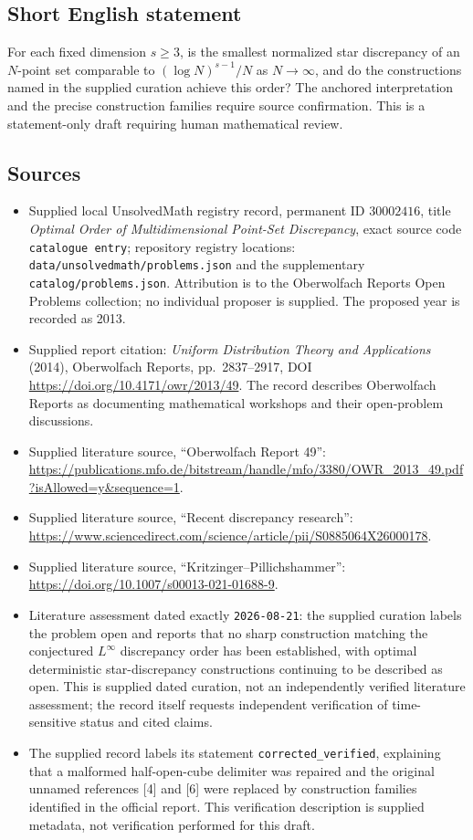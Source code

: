 \documentclass[11pt]{article}
\begin{document}
\subsection{Short English statement}
For each fixed dimension \(s\geq3\), is the smallest normalized star discrepancy of an \(N\)-point set comparable to \((\log N)^{s-1}/N\) as \(N\to\infty\), and do the constructions named in the supplied curation achieve this order? The anchored interpretation and the precise construction families require source confirmation. This is a statement-only draft requiring human mathematical review.
\subsection{Sources}
\begin{itemize}
\item Supplied local UnsolvedMath registry record, permanent ID \(30002416\), title \emph{Optimal Order of Multidimensional Point-Set Discrepancy}, exact source code \texttt{catalogue entry}; repository registry locations: \texttt{data/unsolvedmath/problems.json} and the supplementary \texttt{catalog/problems.json}. Attribution is to the Oberwolfach Reports Open Problems collection; no individual proposer is supplied. The proposed year is recorded as 2013.
\item Supplied report citation: \emph{Uniform Distribution Theory and Applications} (2014), Oberwolfach Reports, pp.\ 2837--2917, DOI \url{https://doi.org/10.4171/owr/2013/49}. The record describes Oberwolfach Reports as documenting mathematical workshops and their open-problem discussions.
\item Supplied literature source, ``Oberwolfach Report 49'': \url{https://publications.mfo.de/bitstream/handle/mfo/3380/OWR_2013_49.pdf?isAllowed=y&sequence=1}.
\item Supplied literature source, ``Recent discrepancy research'': \url{https://www.sciencedirect.com/science/article/pii/S0885064X26000178}.
\item Supplied literature source, ``Kritzinger--Pillichshammer'': \url{https://doi.org/10.1007/s00013-021-01688-9}.
\item Literature assessment dated exactly \texttt{2026-08-21}: the supplied curation labels the problem open and reports that no sharp construction matching the conjectured \(L^\infty\) discrepancy order has been established, with optimal deterministic star-discrepancy constructions continuing to be described as open. This is supplied dated curation, not an independently verified literature assessment; the record itself requests independent verification of time-sensitive status and cited claims.
\item The supplied record labels its statement \texttt{corrected\_verified}, explaining that a malformed half-open-cube delimiter was repaired and the original unnamed references [4] and [6] were replaced by construction families identified in the official report. This verification description is supplied metadata, not verification performed for this draft.
\end{itemize}
\end{document}
